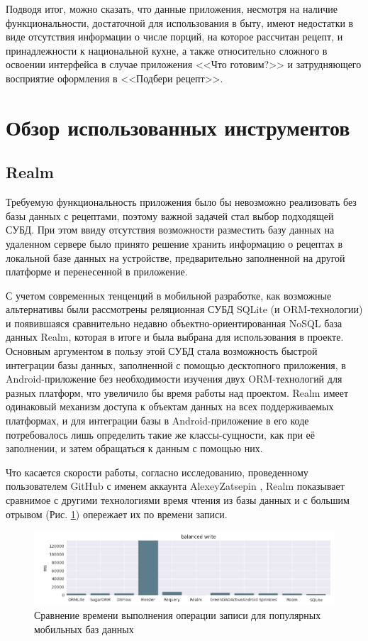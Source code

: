 \documentclass[14pt]{matmex-diploma-custom}
\begin{document}
 Подводя итог, можно сказать, что данные приложения, несмотря на наличие функциональности, достаточной для использования в быту, имеют недостатки в виде отсутствия информации о числе порций, на которое рассчитан рецепт, и принадлежности к национальной кухне, а также относительно сложного в освоении интерфейса в случае приложения <<Что готовим?>> и затрудняющего восприятие оформления в <<Подбери рецепт>>.
 
 \section*{Обзор использованных инструментов}
 \subsection*{Realm}
 Требуемую функциональность приложения было бы невозможно реализовать без базы данных с рецептами, поэтому важной задачей стал выбор подходящей СУБД. При этом ввиду отсутствия возможности разместить базу данных на удаленном сервере было принято решение хранить информацию о рецептах в локальной базе данных на устройстве, предварительно заполненной на другой платформе и перенесенной в приложение.
 
С учетом современных тенценций в мобильной разработке, как возможные альтернативы были рассмотрены реляционная СУБД SQLite (и ORM-технологии) и появившаяся сравнительно недавно объектно-ориентированная NoSQL база данных Realm, которая в итоге и была выбрана для использования в проекте. Основным аргументом в пользу этой СУБД стала возможность быстрой интеграции базы данных, заполненной с помощью десктопного приложения, в Android-приложение без необходимости изучения двух ORM-технологий для разных платформ, что увеличило бы время работы над проектом. Realm имеет одинаковый механизм доступа к объектам данных на всех поддерживаемых платформах, и для интеграции базы в Android-приложение в его коде потребовалось лишь определить такие же классы-сущности, как при её заполнении, и затем обращаться к данным с помощью них.

Что касается скорости работы, согласно исследованию, проведенному пользователем GitHub с именем аккаунта AlexeyZatsepin \cite{realmbenchmark}, Realm показывает сравнимое с другими технологиями время чтения из базы данных и с большим отрывом (Рис. \ref{realmwrite}) опережает их по времени записи. 

\begin{figure}[h]
\centering
\includegraphics[width=\textwidth]{balanced_write.png}
\caption{Сравнение времени выполнения операции записи для популярных мобильных баз данных}
\label{realmwrite}
\end{figure}
\end{document}
